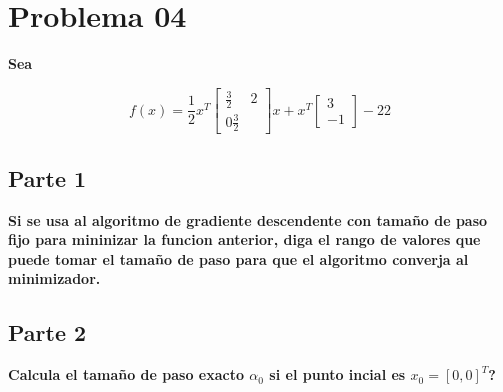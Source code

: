 \section*{Problema 04}

\textbf{Sea}

\begin{equation*}
    f(x) = \frac{1}{2}x^T \begin{bmatrix}
        \frac{3}{2} & 2 \\
        0 \frac{3}{2}
    \end{bmatrix}x + x^T \begin{bmatrix}
        3 \\ -1
    \end{bmatrix} -22
\end{equation*}

\subsection*{Parte 1}

\textbf{Si se usa al algoritmo de gradiente descendente con tamaño de paso fijo para mininizar la funcion anterior, diga el rango de valores que puede tomar el tamaño de paso para que el algoritmo converja al minimizador.}

\subsection*{Parte 2}

\textbf{Calcula el tamaño de paso exacto $\alpha_0$ si el punto incial es $x_0 = [0, 0]^T$?}